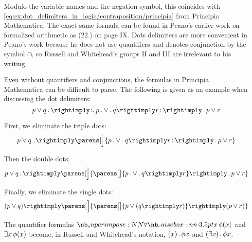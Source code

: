 \begin{example}
\begin{thmenum}
    Modulo the variable names and the negation symbol, this coincides with \eqref{eq:ex:dot_delimiters_in_logic/contraposition/principia} from Principia Mathematica. The exact same formula can be found in Peano's earlier work \cite{Peano1889ArithmeticesPrincipia} on formalized arithmetic as (22.) on page IX. Dots delimiters are more convenient in Peano's work because he does not use quantifiers and denotes conjunction by the symbol \( {\cap} \), so Russell and Whitehead's groups II and III are irrelevant to his writing.

     Even without quantifiers and conjunctions, the formulas in Principia Mathematica can be difficult to parse. The following is given as an example when discussing the dot delimiters:
    \begin{equation}\label{eq:ex:dot_delimiters_in_logic/complicated/principia}
      p \vee q \qdot \rightimply \mathinner{\phantom{:}\mathllap{:}\mathrlap{.}\phantom{.}} p \qdot \vee \qdot q \rightimply r \mathinner{:} \rightimply \qdot p \vee r
    \end{equation}

    First, we eliminate the triple dots:
    \begin{equation}\label{eq:ex:dot_delimiters_in_logic/complicated/principia_without_triple}
      p \vee q \ . \rightimply \parens[\Big]{ p \qdot \vee \qdot q \rightimply r \mathinner{:} \rightimply \qdot p \vee r }
    \end{equation}

    Then the double dots:
    \begin{equation}\label{eq:ex:dot_delimiters_in_logic/complicated/principia_without_double}
      p \vee q \qdot \rightimply \parens[\Big]{ \parens[\big]{ p \qdot \vee \qdot q \rightimply r } \rightimply \qdot p \vee r }
    \end{equation}

    Finally, we eliminate the single dots:
    \begin{equation}\label{eq:ex:dot_delimiters_in_logic/complicated/plain}
      (p \vee q) \rightimply \parens[\Big]{ \parens[\big]{ p \vee (q \rightimply r) } \rightimply (p \vee r) }
    \end{equation}

     The quantifier formulas \( \qforall x \phi(x) \) and \( \qexists x \phi(x) \) become, in Russell and Whitehead's notation, \( (x) \mathinner{.} \phi x \) and \( (\exists x) \mathinner{.} \phi x \).


\end{thmenum}
\end{example}
